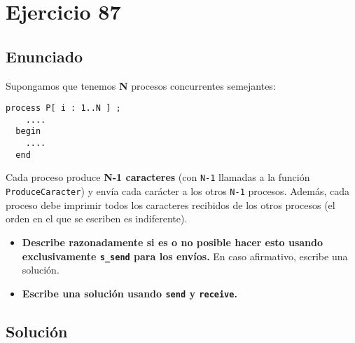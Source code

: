 \documentclass[a4paper,12pt]{article}
\begin{document}
\section{Ejercicio 87}

\subsection{Enunciado}

Supongamos que tenemos \textbf{N} procesos concurrentes semejantes:

\begin{lstlisting}[style=customcpp]
process P[ i : 1..N ] ;
    ....
  begin
    ....
  end
\end{lstlisting}

Cada proceso produce \textbf{N-1 caracteres} (con \texttt{N-1} llamadas a la función \texttt{ProduceCaracter}) y envía cada carácter a los otros \texttt{N-1} procesos. Además, cada proceso debe imprimir todos los caracteres recibidos de los otros procesos (el orden en el que se escriben es indiferente).

\begin{itemize}
    \item \textbf{Describe razonadamente si es o no posible hacer esto usando exclusivamente \texttt{s\_send} para los envíos.} En caso afirmativo, escribe una solución.
    \item \textbf{Escribe una solución usando \texttt{send} y \texttt{receive}.}
\end{itemize}

\subsection{Solución}
\end{document}
